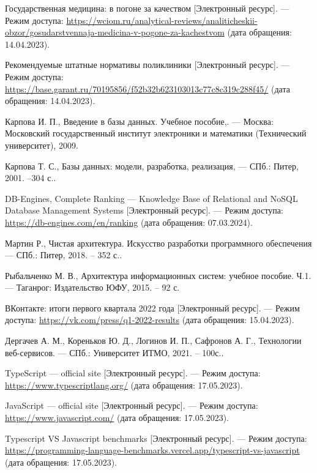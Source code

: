 \begin{thebibliography}{}
	Государственная медицина: в погоне за качеством [Электронный ресурс]. --- Режим доступа: \url{https://wciom.ru/analytical-reviews/analiticheskii-obzor/gosudarstvennaja-medicina-v-pogone-za-kachestvom} (дата обращения: 14.04.2023).
	
	Рекомендуемые штатные нормативы поликлиники [Электронный ресурс]. --- Режим доступа: \url{https://base.garant.ru/70195856/f52b32b623103013c77c8c319c288f45/} (дата обращения: 14.04.2023).
	
	Карпова И. П., Введение в базы данных. Учебное пособие,. --- Москва: Московский государственный институт электроники и математики (Технический университет), 2009.
	
	Карпова Т. С., Базы данных: модели, разработка, реализация, --- СПб.: Питер, 2001. --304 с..

	DB-Engines, Complete Ranking --- Knowledge Base of Relational and NoSQL Database Management Systems  [Электронный ресурс]. --- Режим доступа: \url{https://db-engines.com/en/ranking} (дата обращения: 07.03.2024).
	
	Мартин Р., Чистая архитектура. Искусство разработки программного обеспечения --- СПб.: Питер, 2018. -- 352 с..
	
	Рыбальченко М. В., Архитектура информационных систем: учебное пособие. Ч.1. --- Таганрог: Издательство ЮФУ, 2015. -- 92 с.
	
	ВКонтакте: итоги первого квартала 2022 года [Электронный ресурс]. --- Режим доступа: \url{https://vk.com/press/q1-2022-results} (дата обращения: 15.04.2023).
	
	Дергачев А. М., Кореньков Ю. Д., Логинов И. П., Сафронов А. Г., Технологии веб-сервисов. --- СПб.: Университет ИТМО, 2021. -- 100с..
	
	TypeScript --- official site [Электронный ресурс]. --- Режим доступа: \url{https://www.typescriptlang.org/} (дата обращения: 17.05.2023).

	JavaScript --- official site [Электронный ресурс]. --- Режим доступа: \url{https://www.javascript.com/} (дата обращения: 17.05.2023).
	
	Typescript VS Javascript benchmarks [Электронный ресурс]. --- Режим доступа: \url{https://programming-language-benchmarks.vercel.app/typescript-vs-javascript} (дата обращения: 17.05.2023).


\end{thebibliography}
